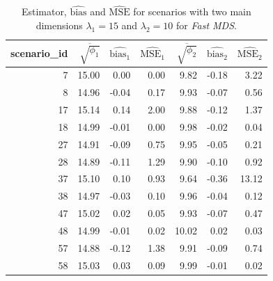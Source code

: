 \documentclass[11pt]{report}
\begin{document}
\begin{table}[ht]
\centering
\begin{tabular}{rrrrrrr}
scenario\_id & $\overline{\sqrt{\phi_1}}$ & $\widehat{\mbox{bias}_1}$ & $\widehat{\mbox{MSE}_1}$ & $\overline{\sqrt{\phi_2}}$ & $\widehat{\mbox{bias}_2}$ & $\widehat{\mbox{MSE}_2}$ \\  
  \hline
  7 & 15.00 & 0.00 & 0.00 & 9.82 & -0.18 & 3.22 \\ 
  8 & 14.96 & -0.04 & 0.17 & 9.93 & -0.07 & 0.56 \\ 
  17 & 15.14 & 0.14 & 2.00 & 9.88 & -0.12 & 1.37 \\ 
  18 & 14.99 & -0.01 & 0.00 & 9.98 & -0.02 & 0.04 \\ 
  27 & 14.91 & -0.09 & 0.75 & 9.95 & -0.05 & 0.21 \\ 
  28 & 14.89 & -0.11 & 1.29 & 9.90 & -0.10 & 0.92 \\ 
  37 & 15.10 & 0.10 & 0.93 & 9.64 & -0.36 & 13.12 \\ 
  38 & 14.97 & -0.03 & 0.10 & 9.96 & -0.04 & 0.12 \\ 
  47 & 15.02 & 0.02 & 0.05 & 9.93 & -0.07 & 0.47 \\ 
  48 & 14.99 & -0.01 & 0.02 & 10.02 & 0.02 & 0.03 \\ 
  57 & 14.88 & -0.12 & 1.38 & 9.91 & -0.09 & 0.74 \\ 
  58 & 15.03 & 0.03 & 0.09 & 9.99 & -0.01 & 0.02 \\ 
   \hline
\end{tabular}
\caption{Estimator, $\widehat{\mbox{bias}}$ and $\widehat{\mbox{MSE}}$ for scenarios with two main dimensions $\lambda_1 = 15$ and $\lambda_2 = 10$ for \textit{Fast MDS}.}
\end{table}

\FloatBarrier
\end{document}
